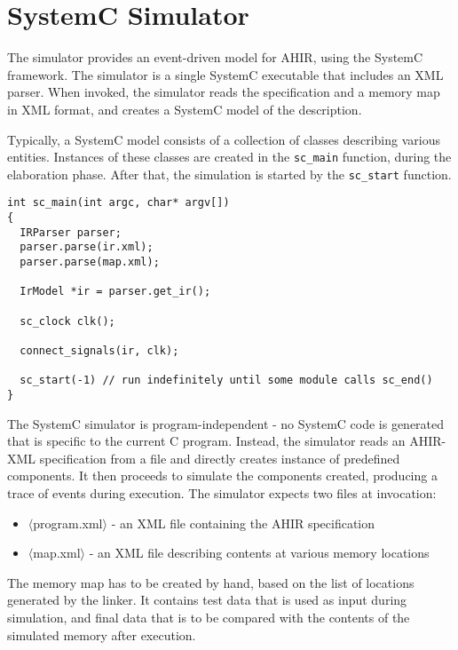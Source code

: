 \documentclass[12pt]{article}
\begin{document}
\section{SystemC Simulator}

The simulator provides an event-driven model for AHIR, using the
SystemC framework. The simulator is a single SystemC executable that
includes an XML parser. When invoked, the simulator reads the
specification and a memory map in XML format, and creates a SystemC
model of the description.

Typically, a SystemC model consists of a collection of classes
describing various entities. Instances of these classes are created in
the {\tt sc\_main} function, during the elaboration phase. After that,
the simulation is started by the {\tt sc\_start} function.

\begin{verbatim}
int sc_main(int argc, char* argv[])
{
  IRParser parser;
  parser.parse(ir.xml);
  parser.parse(map.xml);

  IrModel *ir = parser.get_ir();

  sc_clock clk();

  connect_signals(ir, clk);

  sc_start(-1) // run indefinitely until some module calls sc_end()
}
\end{verbatim}

The SystemC simulator is program-independent - no SystemC code is
generated that is specific to the current C program. Instead, the
simulator reads an AHIR-XML specification from a file and directly
creates instance of predefined components. It then proceeds to
simulate the components created, producing a trace of events during
execution. The simulator expects two files at invocation:

\begin{itemize}
\item $\langle$program.xml$\rangle$ - an XML file containing the AHIR
      specification
\item $\langle$map.xml$\rangle$ - an XML file describing contents at
      various memory locations
\end{itemize}

The memory map has to be created by hand, based on the list of
locations generated by the linker. It contains test data that is used
as input during simulation, and final data that is to be compared with
the contents of the simulated memory after execution.

\end{document}
